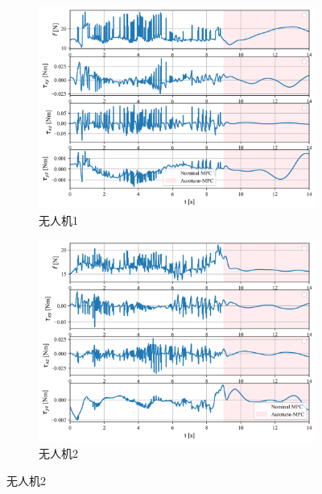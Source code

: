 \documentclass[lang=chs, degree=master, blindreview=true, winfonts=true]{yanputhesis}
\begin{document}
\begin{figure}[hbt!]
    \centering
    \begin{subfigure}[b]{0.48\textwidth}
        \centering
        \includegraphics[width=\textwidth]{picture/kk/1.png}
        \caption{无人机1}
        \label{quadrotoru0}
    \end{subfigure}
    \hfill
    \begin{subfigure}[b]{0.48\textwidth}
        \centering
        \includegraphics[width=\textwidth]{picture/kk/2.png}
        \caption{无人机2}
        \label{quadrotoru1}
    \end{subfigure}
    
    \vspace{0.5cm} %
    

\end{figure}
\end{document}
